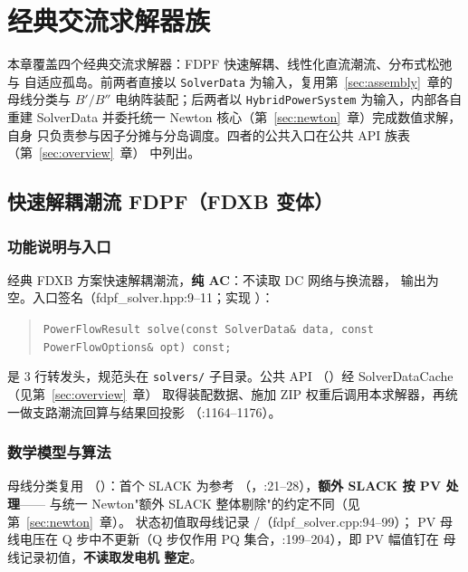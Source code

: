 \section{经典交流求解器族}\label{sec:classic}

本章覆盖四个经典交流求解器：FDPF 快速解耦、线性化直流潮流、分布式松弛与
自适应孤岛。前两者直接以 \texttt{SolverData} 为输入，复用第~\ref{sec:assembly}~章的
母线分类与 $B'/B''$ 电纳阵装配；后两者以 \texttt{HybridPowerSystem} 为输入，内部各自
重建 SolverData 并委托统一 Newton 核心（第~\ref{sec:newton}~章）完成数值求解，自身
只负责参与因子分摊与分岛调度。四者的公共入口在公共 API 族表（第~\ref{sec:overview}~章）
中列出。

\subsection{快速解耦潮流 FDPF（FDXB 变体）}


\subsubsection*{功能说明与入口}
经典 FDXB 方案快速解耦潮流，\textbf{纯 AC}：不读取 DC 网络与换流器，
 输出为空。入口签名（fdpf\_solver.hpp:9--11；实现
）：
\begin{quote}\footnotesize
\texttt{PowerFlowResult solve(const SolverData\& data, const PowerFlowOptions\& opt) const;}
\end{quote}
 是 3 行转发头，规范头在
\texttt{solvers/} 子目录。公共 API 
（）经 SolverDataCache（见第~\ref{sec:overview}~章）
取得装配数据、施加 ZIP 权重后调用本求解器，再统一做支路潮流回算与结果回投影
（:1164--1176）。

\subsubsection*{数学模型与算法}
母线分类复用 
（）：首个 SLACK 为参考
（，:21--28），\textbf{额外 SLACK 按 PV 处理}——
与统一 Newton"额外 SLACK 整体剔除"的约定不同（见第~\ref{sec:newton}~章）。
状态初值取母线记录 /（fdpf\_solver.cpp:94--99）；
PV 母线电压在 Q 步中不更新（Q 步仅作用 PQ 集合，:199--204），即 PV 幅值钉在
母线记录初值，\textbf{不读取发电机  整定}。

